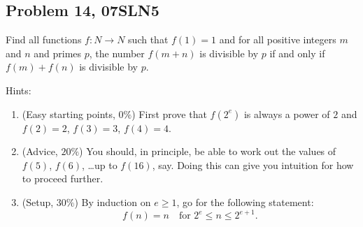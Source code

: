 \documentclass[11pt,twoside]{scrartcl}
\begin{document}
\subsection{Problem 14, 07SLN5}

\begin{problem}
    Find all functions $f : N \to N$ such that $f(1) = 1$ and for all positive integers $m$ and $n$ and primes $p$, the number $f(m + n)$ is divisible by $p$ if and only if $f (m) + f (n)$ is divisible by $p$.
\end{problem}

Hints:
\begin{enumerate}
    \item (Easy starting points, $0\%$) First prove that $f(2^e)$ is always a power of $2$ and $f(2)=2$, $f(3)=3$, $f(4)=4$.
    \item (Advice, $20\%$) You should, in principle, be able to work out the values of $f(5)$, $f(6)$, \ldots up to $f(16)$, say. Doing this can give you intuition for how to proceed further.
    \item (Setup, $30\%$) By induction on $e \ge 1$, go for the following statement:
    \[ f(n) = n \quad\text{for } 2^e \le n \le 2^{e+1}.\]
\end{enumerate}
\end{document}
